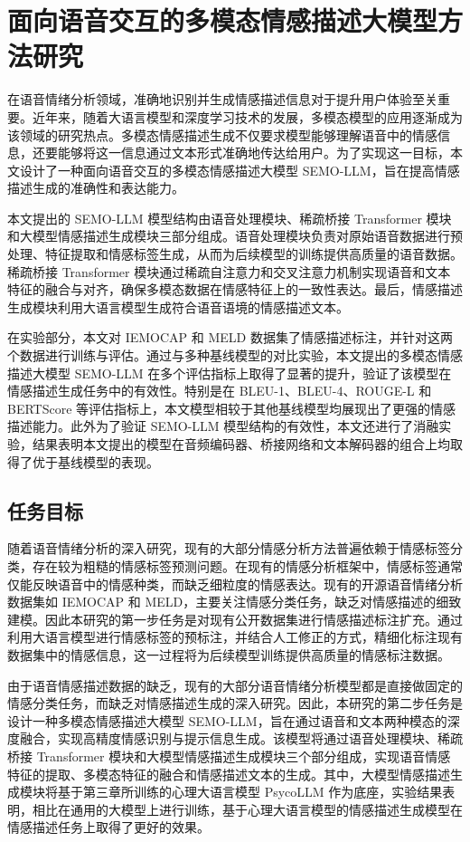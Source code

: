 
\chapter{面向语音交互的多模态情感描述大模型方法研究}

在语音情绪分析领域，准确地识别并生成情感描述信息对于提升用户体验至关重要。近年来，随着大语言模型和深度学习技术的发展，多模态模型的应用逐渐成为该领域的研究热点。多模态情感描述生成不仅要求模型能够理解语音中的情感信息，还要能够将这一信息通过文本形式准确地传达给用户。为了实现这一目标，本文设计了一种面向语音交互的多模态情感描述大模型 SEMO-LLM，旨在提高情感描述生成的准确性和表达能力。

本文提出的 SEMO-LLM 模型结构由语音处理模块、稀疏桥接 Transformer 模块和大模型情感描述生成模块三部分组成。语音处理模块负责对原始语音数据进行预处理、特征提取和情感标签生成，从而为后续模型的训练提供高质量的语音数据。稀疏桥接 Transformer 模块通过稀疏自注意力和交叉注意力机制实现语音和文本特征的融合与对齐，确保多模态数据在情感特征上的一致性表达。最后，情感描述生成模块利用大语言模型生成符合语音语境的情感描述文本。

在实验部分，本文对 IEMOCAP 和 MELD 数据集了情感描述标注，并针对这两个数据进行训练与评估。通过与多种基线模型的对比实验，本文提出的多模态情感描述大模型 SEMO-LLM 在多个评估指标上取得了显著的提升，验证了该模型在情感描述生成任务中的有效性。特别是在 BLEU-1、BLEU-4、ROUGE-L 和 BERTScore 等评估指标上，本文模型相较于其他基线模型均展现出了更强的情感描述能力。此外为了验证 SEMO-LLM 模型结构的有效性，本文还进行了消融实验，结果表明本文提出的模型在音频编码器、桥接网络和文本解码器的组合上均取得了优于基线模型的表现。

\section{任务目标}

随着语音情绪分析的深入研究，现有的大部分情感分析方法普遍依赖于情感标签分类，存在较为粗糙的情感标签预测问题。在现有的情感分析框架中，情感标签通常仅能反映语音中的情感种类，而缺乏细粒度的情感表达。现有的开源语音情绪分析数据集如 IEMOCAP 和 MELD，主要关注情感分类任务，缺乏对情感描述的细致建模。因此本研究的第一步任务是对现有公开数据集进行情感描述标注扩充。通过利用大语言模型进行情感标签的预标注，并结合人工修正的方式，精细化标注现有数据集中的情感信息，这一过程将为后续模型训练提供高质量的情感标注数据。

由于语音情感描述数据的缺乏，现有的大部分语音情绪分析模型都是直接做固定的情感分类任务，而缺乏对情感描述生成的深入研究。因此，本研究的第二步任务是设计一种多模态情感描述大模型 SEMO-LLM，旨在通过语音和文本两种模态的深度融合，实现高精度情感识别与提示信息生成。该模型将通过语音处理模块、稀疏桥接 Transformer 模块和大模型情感描述生成模块三个部分组成，实现语音情感特征的提取、多模态特征的融合和情感描述文本的生成。其中，大模型情感描述生成模块将基于第三章所训练的心理大语言模型 PsycoLLM 作为底座，实验结果表明，相比在通用的大模型上进行训练，基于心理大语言模型的情感描述生成模型在情感描述任务上取得了更好的效果。

